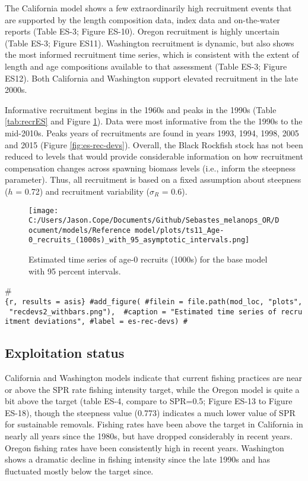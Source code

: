 \documentclass[11pt,
  english,
  letterpaper,
]{article}
\begin{document}
The California model shows a few extraordinarily high recruitment events that are supported by the length composition data, index data and on-the-water reports (Table ES-3; Figure ES-10). Oregon recruitment is highly uncertain (Table ES-3; Figure ES11). Washington recruitment is dynamic, but also shows the most informed recruitment time series, which is consistent with the extent of length and age compositions available to that assessment (Table ES-3; Figure ES12). Both California and Washington support elevated recruitment in the late 2000s.

Informative recruitment begins in the 1960s and peaks in the 1990s (Table \ref{tab:recrES} and Figure \ref{fig:es-recruits}). Data were most informative from the the 1990s to the mid-2010s. Peaks years of recruitments are found in years 1993, 1994, 1998, 2005 and 2015 (Figure \ref{fig:es-rec-devs}). Overall, the Black Rockfish stock has not been reduced to levels that would provide considerable information on how recruitment compensation changes across spawning biomass levels (i.e., inform the steepness parameter). Thus, all recruitment is based on a fixed assumption about steepness (\(h\) = 0.72) and recruitment variability (\(\sigma_R\) = 0.6).



\begin{figure}
\centering
\texttt{[image: C:/Users/Jason.Cope/Documents/Github/Sebastes\_melanops\_OR/Document/models/Reference model/plots/ts11\_Age-0\_recruits\_(1000s)\_with\_95\_asymptotic\_intervals.png]}
\caption{Estimated time series of age-0 recruits (1000s) for the base model with 95 percent intervals.\label{fig:es-recruits}}
\end{figure}

\#\texttt{\{r,\ results\ =\ \textquotesingle{}asis\textquotesingle{}\}\ \#add\_figure(\ \#filein\ =\ file.path(mod\_loc,\ "plots",\ "recdevs2\_withbars.png"),\ \ \#caption\ =\ "Estimated\ time\ series\ of\ recruitment\ deviations",\ \#label\ =\ \textquotesingle{}es-rec-devs\textquotesingle{})\ \#}

\hypertarget{exploitation-status}{%
\subsection*{Exploitation status}\label{exploitation-status}}

California and Washington models indicate that current fishing practices are near or above the SPR rate fishing intensity target, while the Oregon model is quite a bit above the target (table ES-4, compare to SPR=0.5; Figure ES-13 to Figure ES-18), though the steepness value (0.773) indicates a much lower value of SPR for sustainable removals. Fishing rates have been above the target in California in nearly all years since the 1980s, but have dropped considerably in recent years. Oregon fishing rates have been consistently high in recent years. Washington shows a dramatic decline in fishing intensity since the late 1990s and has fluctuated mostly below the target since.
\end{document}
